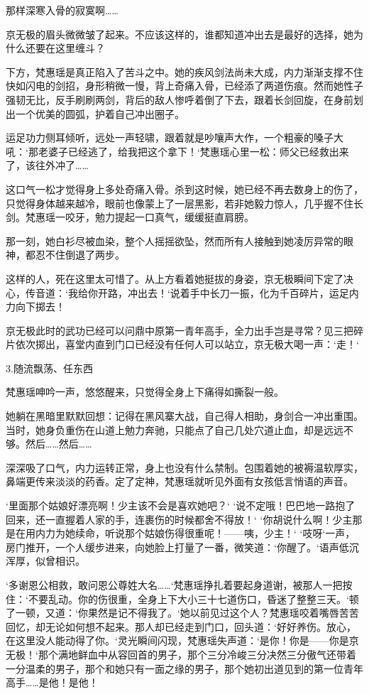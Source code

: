 那样深寒入骨的寂寞啊……

京无极的眉头微微皱了起来。不应该这样的，谁都知道冲出去是最好的选择，她为什么还要在这里缠斗？

下方，梵惠瑶是真正陷入了苦斗之中。她的疾风剑法尚未大成，内力渐渐支撑不住快如闪电的剑招，身形稍微一慢，背上奇痛入骨，已经添了两道伤痕。然而她性子强韧无比，反手刷刷两剑，背后的敌人惨呼着倒了下去，跟着长剑回旋，在身前划出一个优美的圆弧，护着自己冲出圈子。

运足功力侧耳倾听，远处一声轻啸，跟着就是吵嚷声大作，一个粗豪的嗓子大吼：‘那老婆子已经逃了，给我把这个拿下！‘梵惠瑶心里一松：师父已经救出来了，该往外冲了……

这口气一松才觉得身上多处奇痛入骨。杀到这时候，她已经不再去数身上的伤了，只觉得身体越来越冷，眼前也像蒙上了一层黑影，若非她毅力惊人，几乎握不住长剑。梵惠瑶一咬牙，勉力提起一口真气，缓缓挺直肩膀。

那一刻，她白衫尽被血染，整个人摇摇欲坠，然而所有人接触到她凌厉异常的眼神，都忍不住倒退了两步。

这样的人，死在这里太可惜了。从上方看着她挺拔的身姿，京无极瞬间下定了决心，传音道：‘我给你开路，冲出去！‘说着手中长刀一振，化为千百碎片，运足内力向下掷去！

京无极此时的武功已经可以问鼎中原第一青年高手，全力出手岂是寻常？见三把碎片依次掷出，喜堂内直到门口已经没有任何人可以站立，京无极大喝一声：‘走！‘

3.随流飘荡、任东西

梵惠瑶呻吟一声，悠悠醒来，只觉得全身上下痛得如撕裂一般。

她躺在黑暗里默默回想：记得在黑风寨大战，自己得人相助，身剑合一冲出重围。当时，她身负重伤在山道上勉力奔驰，只能点了自己几处穴道止血，却是远远不够。然后……然后……

深深吸了口气，内力运转正常，身上也没有什么禁制。包围着她的被褥温软厚实，鼻端更传来淡淡的药香。定了定神，梵惠瑶就听见外面有女孩低言悄语的声音。

‘里面那个姑娘好漂亮啊！少主该不会是喜欢她吧？‘ ‘说不定哦！巴巴地一路抱了回来，还一直握着人家的手，连裹伤的时候都舍不得放！‘ ‘你胡说什么啊！少主那是在用内力为她续命，听说那个姑娘伤得很重呢！——咦，少主！‘ ‘吱呀‘一声，房门推开，一个人缓步进来，向她脸上打量了一番，微笑道：‘你醒了。‘语声低沉浑厚，似曾相识。

‘多谢恩公相救，敢问恩公尊姓大名……‘梵惠瑶挣扎着要起身道谢，被那人一把按住：‘不要乱动。你的伤很重，全身上下大小三十七道伤口，昏迷了整整三天。‘顿了一顿，又道：‘你果然是记不得我了。‘她以前见过这个人？梵惠瑶咬着嘴唇苦苦回忆，却无论如何想不起来。那人却已经走到门口，回头道：‘好好养伤。放心，在这里没人能动得了你。‘灵光瞬间闪现，梵惠瑶失声道：‘是你！你是——你是京无极！‘那个满地鲜血中从容回首的男子，那个三分冷峻三分决然三分傲气还带着一分温柔的男子，那个和她只有一面之缘的男子，那个她初出道见到的第一位青年高手……是他！是他！

